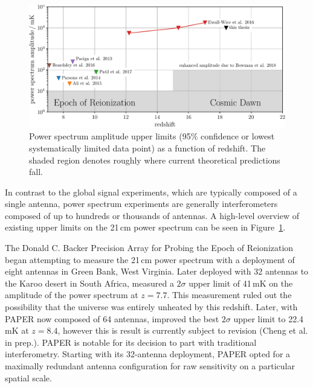 \begin{bibunit}
\begin{figure}[t]
    \centering
    \includegraphics[width=\textwidth]{figures/chapter1/power-spectrum-upper-limits/power-spectrum-upper-limits}
    \caption{
        Power spectrum amplitude upper limits (95\% confidence or lowest systematically limited data
        point) as a function of redshift. The shaded region denotes roughly where current
        theoretical predictions fall.
    }
    \label{fig:power-spectrum-upper-limits}
\end{figure}

In contrast to the global signal experiments, which are typically composed of a single antenna,
power spectrum experiments are generally interferometers composed of up to hundreds or thousands of
antennas. A high-level overview of existing upper limits on the 21\,cm power spectrum can be seen in
Figure~\ref{fig:power-spectrum-upper-limits}.


The Donald C. Backer Precision Array for Probing the Epoch of Reionization
\citep[PAPER;][]{2010AJ....139.1468P} began attempting to measure the 21\,cm power spectrum with a
deployment of eight antennas in Green Bank, West Virginia. Later deployed with 32 antennas to the
Karoo desert in South Africa, \citet{2014ApJ...788..106P} measured a $2\sigma$ upper limit of 41\,mK
on the amplitude of the power spectrum at $z=7.7$. This measurement ruled out the possibility that
the universe was entirely unheated by this redshift.  Later, with PAPER now composed of 64 antennas,
\citet{2015ApJ...809...61A} improved the best $2\sigma$ upper limit to 22.4\,mK at $z=8.4$, however
this is result is currently subject to revision (Cheng et al. in prep.). PAPER is notable for its
decision to part with traditional interferometry. Starting with its 32-antenna deployment, PAPER
opted for a maximally redundant antenna configuration for raw sensitivity on a particular spatial
scale.


\end{bibunit}
